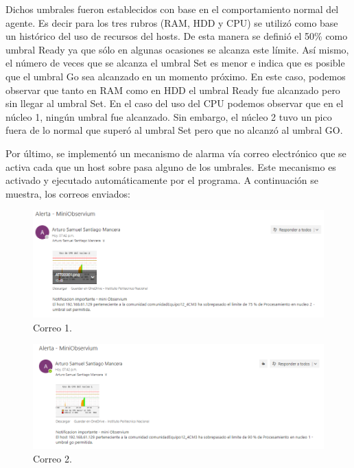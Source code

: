 Dichos umbrales fueron establecidos con base en el comportamiento normal del agente. Es decir para los tres rubros (RAM, HDD y CPU) se utilizó como base un histórico del uso de recursos del hosts. De esta manera se definió el 50\% como umbral Ready ya que sólo en algunas ocasiones se alcanza este límite. Así mismo, el número de veces que se alcanza el umbral Set es menor e indica que es posible que el umbral Go sea alcanzado en un momento próximo. En este caso, podemos observar que tanto en RAM como en HDD el umbral Ready fue alcanzado pero sin llegar al umbral Set. En el caso del uso del CPU podemos observar que en el núcleo 1, ningún umbral fue alcanzado. Sin embargo, el núcleo 2 tuvo un pico fuera de lo normal que superó al umbral Set pero que no alcanzó al umbral GO.

Por último, se implementó un mecanismo de alarma vía correo electrónico que se activa cada que un host sobre pasa alguno de los umbrales. Este mecanismo es activado y ejecutado automáticamente por el programa. A continuación se muestra, los correos enviados:

\FloatBarrier
\begin{figure}[htbp!]
		\centering
			\includegraphics[width=.9 \textwidth]{images/correo1}
		\caption{Correo 1.}
		\label{image:correo1}
\end{figure}
\FloatBarrier

\FloatBarrier
\begin{figure}[htbp!]
		\centering
			\includegraphics[width=1 \textwidth]{images/correo2}
		\caption{Correo 2.}
		\label{image:correo2}
\end{figure}
\FloatBarrier

